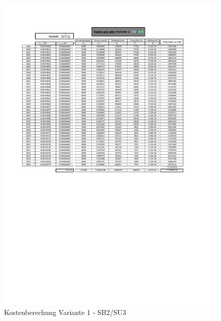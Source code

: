 \begin{figure}[h!]
	\centering
	\includegraphics[width=\textwidth]{figures/Anhang/f-00-A-V1-B2-U3}
	\caption{Kostenberechung Variante 1 - SB2/SU3}
\end{figure}

